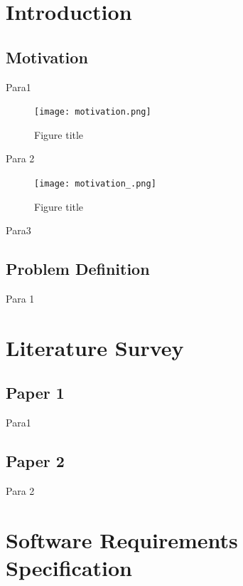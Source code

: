 \documentclass[oneside,a4paper,12pt, times]{book}
\begin{document}
\setlength{\parindent}{11mm}
\chapter{Introduction}

\section{Motivation}
\-\hspace{0.5in}Para1
\begin{figure}[h]
    \centering
    \texttt{[image: motivation.png]}   
    \caption{Figure title}
    \label{fig:my_label}
\end{figure}

Para 2
\begin{figure}[h]
    \centering
    \texttt{[image: motivation\_.png]}   
    \caption{Figure title}
    \label{fig:my_label}
\end{figure}
  

Para3
\section{Problem Definition}
\label{sec:problem}
         Para 1

\chapter{Literature Survey}
\section{Paper 1}
Para1

\section{Paper 2}
Para 2
\vskip 10cm

			
\chapter{Software Requirements Specification}
\end{document}
